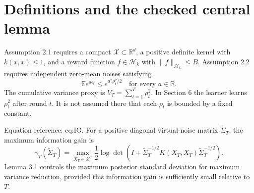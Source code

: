 \documentclass[10pt]{article}
\begin{document}
\section*{Definitions and the checked central lemma}
Assumption 2.1 requires a compact \(\mathcal X\subset\mathbb R^d\), a positive definite kernel with \(k(x,x)\le1\), and a reward function \(f\in\mathcal H_k\) with \(\|f\|_{\mathcal H_k}\le B\). Assumption 2.2 requires independent zero-mean noises satisfying \[\mathbb E e^{a\epsilon_t}\le e^{a^2\rho_t^2/2}
 \quad\text{for every }a\in\mathbb R.\] The cumulative variance proxy is \(V_T=\sum_{t=1}^T\rho_t^2\). In Section 6 the learner learns \(\rho_t^2\) after round \(t\). It is not assumed there that each \(\rho_t\) is bounded by a fixed constant.\par
Equation reference: eq:IG. For a positive diagonal virtual-noise matrix \(\widetilde\Sigma_T\), the maximum information gain is \[
 \gamma_T(\widetilde\Sigma_T)
 =\max_{X_T\in\mathcal X^T}
 \frac12\log\det\!\left(I+\widetilde\Sigma_T^{-1/2}
                     K(X_T,X_T)\widetilde\Sigma_T^{-1/2}\right).\] Lemma 3.1 controls the maximum posterior standard deviation for maximum variance reduction, provided this information gain is sufficiently small relative to \(T\).\par
\end{document}
